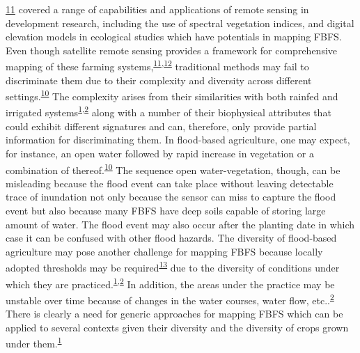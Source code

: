 \documentclass[12pt,oneside]{article}
\begin{document}
\protect\hyperlink{ref-Wegmann_et_al_2016}{11} covered a range of
capabilities and applications of remote sensing in development research,
including the use of spectral vegetation indices, and digital elevation
models in ecological studies which have potentials in mapping FBFS. Even
though satellite remote sensing provides a framework for comprehensive
mapping of these farming
systems,\textsuperscript{\protect\hyperlink{ref-Wegmann_et_al_2016}{11},\protect\hyperlink{ref-Konecny_2014}{12}}
traditional methods may fail to discriminate them due to their
complexity and diversity across different
settings.\textsuperscript{\protect\hyperlink{ref-Boschetti_et_al_2014}{10}}
The complexity arises from their similarities with both rainfed and
irrigated
systems\textsuperscript{\protect\hyperlink{ref-Puertas_et_al_2011}{1},\protect\hyperlink{ref-VanSteenbergen_et_al_2010}{2}}
along with a number of their biophysical attributes that could exhibit
different signatures and can, therefore, only provide partial
information for discriminating them. In flood-based agriculture, one may
expect, for instance, an open water followed by rapid increase in
vegetation or a combination of
thereof.\textsuperscript{\protect\hyperlink{ref-Boschetti_et_al_2014}{10}}
The sequence open water-vegetation, though, can be misleading because
the flood event can take place without leaving detectable trace of
inundation not only because the sensor can miss to capture the flood
event but also because many FBFS have deep soils capable of storing
large amount of water. The flood event may also occur after the planting
date in which case it can be confused with other flood hazards. The
diversity of flood-based agriculture may pose another challenge for
mapping FBFS because locally adopted thresholds may be
required\textsuperscript{\protect\hyperlink{ref-Bashari_et_al_2008}{13}}
due to the diversity of conditions under which they are
practiced.\textsuperscript{\protect\hyperlink{ref-Puertas_et_al_2011}{1},\protect\hyperlink{ref-VanSteenbergen_et_al_2010}{2}}
In addition, the areas under the practice may be unstable over time
because of changes in the water courses, water flow,
etc..\textsuperscript{\protect\hyperlink{ref-VanSteenbergen_et_al_2010}{2}}
There is clearly a need for generic approaches for mapping FBFS which
can be applied to several contexts given their diversity and the
diversity of crops grown under
them.\textsuperscript{\protect\hyperlink{ref-Puertas_et_al_2011}{1}}
\end{document}
